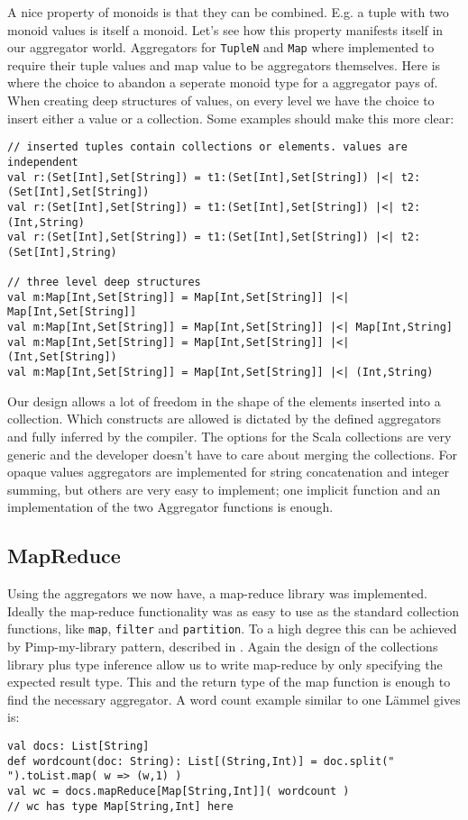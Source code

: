 \documentclass[10pt,a4paper]{article}
\begin{document}
A nice property of monoids is that they can be combined. E.g. a tuple with two monoid values is itself a monoid. Let's see how this property manifests itself in our aggregator world. Aggregators for \lstinline|TupleN| and \lstinline|Map| where implemented to require their tuple values and map value to be aggregators themselves. Here is where the choice to abandon a seperate monoid type for a aggregator pays of. When creating deep structures of values, on every level we have the choice to insert either a value or a collection. Some examples should make this more clear:
\begin{lstlisting}
// inserted tuples contain collections or elements. values are independent
val r:(Set[Int],Set[String]) = t1:(Set[Int],Set[String]) |<| t2:(Set[Int],Set[String])
val r:(Set[Int],Set[String]) = t1:(Set[Int],Set[String]) |<| t2:(Int,String)
val r:(Set[Int],Set[String]) = t1:(Set[Int],Set[String]) |<| t2:(Set[Int],String)

// three level deep structures
val m:Map[Int,Set[String]] = Map[Int,Set[String]] |<| Map[Int,Set[String]]
val m:Map[Int,Set[String]] = Map[Int,Set[String]] |<| Map[Int,String]
val m:Map[Int,Set[String]] = Map[Int,Set[String]] |<| (Int,Set[String])
val m:Map[Int,Set[String]] = Map[Int,Set[String]] |<| (Int,String)
\end{lstlisting}

Our design allows a lot of freedom in the shape of the elements inserted into a collection. Which constructs are allowed is dictated by the defined aggregators and fully inferred by the compiler. The options for the Scala collections are very generic and the developer doesn't have to care about merging the collections. For opaque values aggregators are implemented for string concatenation and integer summing, but others are very easy to implement; one implicit function and an implementation of the two Aggregator functions is enough.

\subsection{MapReduce}

Using the aggregators we now have, a map-reduce library was implemented. Ideally the map-reduce functionality was as easy to use as the standard collection functions, like \lstinline|map|, \lstinline|filter| and \lstinline|partition|. To a high degree this can be achieved by Pimp-my-library pattern, described in \citep{odersky2006pimp}. Again the design of the collections library plus type inference allow us to write map-reduce by only specifying the expected result type. This and the return type of the map function is enough to find the necessary aggregator. A word count example similar to one L\"ammel gives is:
\begin{lstlisting}
val docs: List[String]
def wordcount(doc: String): List[(String,Int)] = doc.split(" ").toList.map( w => (w,1) )
val wc = docs.mapReduce[Map[String,Int]]( wordcount )
// wc has type Map[String,Int] here
\end{lstlisting}
\end{document}
